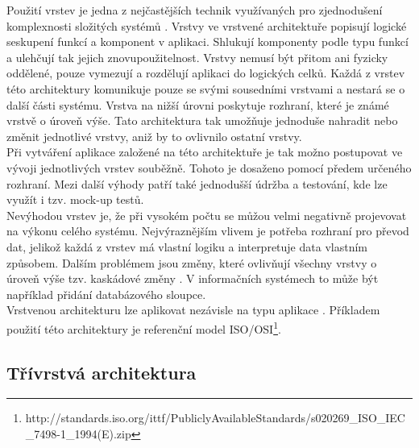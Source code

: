 \documentclass[ing,male,java,dept456]{diploma}						%
\begin{document}
Použití vrstev je jedna z nejčastějších technik využívaných pro zjednodušení komplexnosti složitých systémů \cite{fowler}. Vrstvy ve vrstvené architektuře popisují logické seskupení funkcí a komponent v aplikaci. Shlukují komponenty podle typu funkcí a ulehčují tak jejich znovupoužitelnost. Vrstvy nemusí být přitom ani fyzicky oddělené, pouze vymezují a rozdělují aplikaci do logických celků. Každá z vrstev této architektury komunikuje pouze se svými sousedními vrstvami a nestará se o další části systému. Vrstva na nižší úrovni poskytuje rozhraní, které je známé vrstvě o úroveň výše. Tato architektura tak umožňuje jednoduše nahradit nebo změnit jednotlivé vrstvy, aniž by to ovlivnilo ostatní vrstvy. \\
Při vytváření aplikace založené na této architektuře je tak možno postupovat ve vývoji jednotlivých vrstev souběžně. Tohoto je dosaženo pomocí předem určeného rozhraní. Mezi další výhody patří také jednodušší údržba a testování, kde lze využít i tzv. mock-up testů. \\
Nevýhodou vrstev je, že při vysokém počtu se můžou velmi negativně projevovat na výkonu celého systému. Nejvýraznějším vlivem je potřeba rozhraní pro převod dat, jelikož každá z vrstev má vlastní logiku a interpretuje data vlastním způsobem. Dalším problémem jsou změny, které ovlivňují všechny vrstvy o úroveň výše tzv. kaskádové změny \cite{dresler}. V informačních systémech to může být například přidání databázového sloupce. \\
Vrstvenou architekturu lze aplikovat nezávisle na typu aplikace \cite{msdn}. Příkladem použití této architektury je referenční model ISO/OSI\footnote{ http://standards.iso.org/ittf/PubliclyAvailableStandards/s020269\_ISO\_IEC\_7498-1\_1994(E).zip}. \\

\subsection{Třívrstvá architektura}
\end{document}
